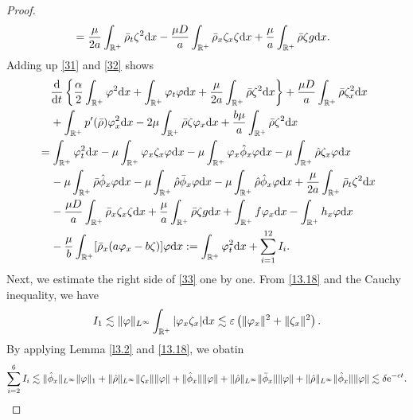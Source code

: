 \documentclass[11pt]{article}
\theoremstyle{plain}
\numberwithin{equation}{section}
\begin{document}
\begin{proof}
\begin{align}
			&=\frac{\mu}{2a}\int_{\mathbb{R}^+}^{}\bar\rho_t\zeta^2{\rm d}x-\frac{\mu D}{a}\int_{\mathbb{R}^+}^{}\bar\rho_x\zeta_x\zeta {\rm d}x+\frac{\mu}{a}\int_{\mathbb{R}^+}^{}\bar\rho\zeta g {\rm d}x.
		\end{align}
		Adding up \eqref{31} and \eqref{32} shows
		\begin{align}\label{33}
			&\;\;\;\;\frac{{\rm d}}{{\rm d}t}\left\{\frac{\alpha}{2}\int_{\mathbb{R}^+}\varphi^2{\rm d}x+\int_{\mathbb{R}^+}^{}\varphi_t\varphi{\rm d}x+\frac{\mu}{2a}\int_{\mathbb{R}^+}^{}\bar\rho\zeta^2{\rm d}x\right\}+\frac{\mu D}{a}\int_{\mathbb{R}^+}^{}\bar\rho\zeta_x^2{\rm d}x	\notag\\
			&\;\;\;\;+\int_{\mathbb{R}^+}^{}p^{\prime}(\bar\rho)\varphi_x^2{\rm d}x-2\mu\int_{\mathbb{R}^+}^{}\bar\rho\zeta\varphi_x{\rm d}x+\frac{b\mu}{a}\int_{\mathbb{R}^+}^{}\bar\rho\zeta^2{\rm d}x\notag\\
			&=\int_{\mathbb{R}^+}\varphi_t^2{\rm d}x-\mu\int_{\mathbb{R}^+}^{}\varphi_x\zeta_x\varphi{\rm d}x-\mu\int_{\mathbb{R}^+}^{}\varphi_x\hat\phi_x\varphi{\rm d}x-\mu\int_{\mathbb{R}^+}^{}\hat\rho\zeta_x\varphi{\rm d}x\notag\\
			&\;\;\;\;-\mu\int_{\mathbb{R}^+}\bar\rho\hat\phi_x\varphi{\rm d}x-\mu\int_{\mathbb{R}^+}\hat\rho\bar\phi_x\varphi{\rm d}x-\mu\int_{\mathbb{R}^+}\hat\rho\hat\phi_x\varphi{\rm d}x+\frac{\mu}{2a}\int_{\mathbb{R}^+}^{}\bar\rho_t\zeta^2{\rm d}x\notag\\
			&\;\;\;\;-\frac{\mu D}{a}\int_{\mathbb{R}^+}^{}\bar\rho_x\zeta_x\zeta {\rm d}x+\frac{\mu}{a}\int_{\mathbb{R}^+}^{}\bar\rho\zeta g{\rm d}x+\int_{\mathbb{R}^+}^{}f\varphi_x{\rm d}x-\int_{\mathbb{R}^+}^{}h_x\varphi{\rm d}x\notag\\
			&\;\;\;\;-\frac{\mu}{b}\int_{\mathbb{R}^+}[\bar\rho_x(a\varphi_x-b\zeta)]\varphi{\rm d}x:=\int_{\mathbb{R}^+}\varphi_t^2{\rm d}x+\sum_{i=1}^{12}I_i.
		\end{align}
		Next, we estimate the right side of \eqref{33} one by one.
		From \eqref{13.18} and the Cauchy inequality, we have
		\begin{equation}\label{I1}
			I_1
			\lesssim\|\varphi\|_{L^{\infty}}\int_{\mathbb{R}^+}|\varphi_x\zeta_x|{\rm d}x
			\lesssim\varepsilon\left(\|\varphi_x\|^2+\|\zeta_x\|^2\right).
		\end{equation}
		By applying Lemma \ref{l3.2} and  \eqref{13.18}, we obatin
		\begin{equation}\label{I26}
			\sum_{i=2}^{6}I_i\lesssim \|\hat\phi_x\|_{L^{\infty}}\|\varphi\|_1+\|\hat\rho\|_{L^{\infty}}\|\zeta_x\|\|\varphi\|+\|\hat\phi_x\|\|\varphi\|+\|\hat\rho\|_{L^{\infty}}\|\bar\phi_x\|\|\varphi\|+\|\hat\rho\|_{L^{\infty}}\|\hat\phi_x\|\|\varphi\|\lesssim \delta{\rm e}^{-ct}.

\end{equation}
\end{proof}
\end{document}
